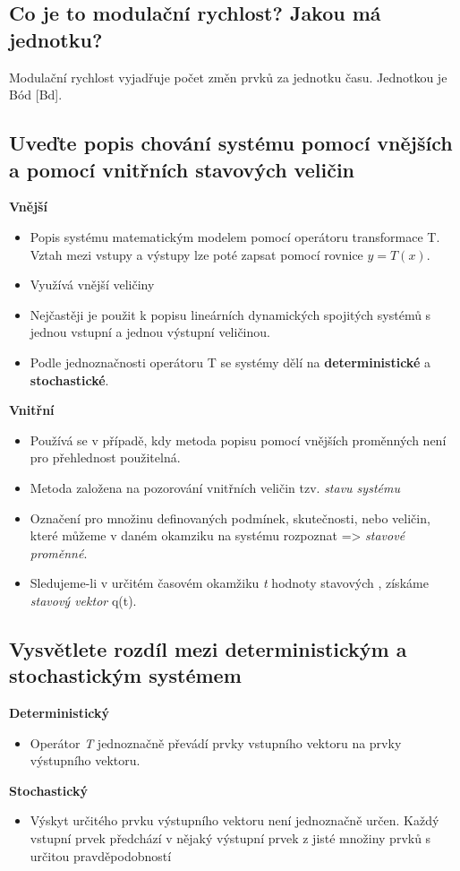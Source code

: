 \subsection{Co je to modulační rychlost? Jakou má jednotku?}
Modulační rychlost vyjadřuje počet změn prvků za jednotku času. Jednotkou je Bód [Bd].

\subsection{Uveďte popis chování systému pomocí vnějších a pomocí vnitřních stavových veličin}
\textbf{Vnější}
\begin{itemize}
    \item Popis systému matematickým modelem pomocí operátoru transformace T. Vztah mezi vstupy a výstupy lze poté zapsat pomocí rovnice $y=T(x)$.
    \item Využívá vnější veličiny
    \item Nejčastěji je použit k popisu lineárních dynamických  spojitých systémů s jednou vstupní a jednou výstupní veličinou.
    \item Podle jednoznačnosti operátoru T se systémy dělí na \textbf{deterministické} a \textbf{stochastické}.
    
\end{itemize}

\textbf{Vnitřní}
\begin{itemize}
    \item Používá se v případě, kdy metoda popisu pomocí vnějších proměnných není pro přehlednost použitelná.
    \item Metoda založena na pozorování vnitřních veličin tzv. \textit{stavu systému}
    \item Označení pro množinu definovaných podmínek, skutečnosti, nebo veličin, které můžeme v daném okamziku na systému rozpoznat => \textit{stavové proměnné}.
    \item Sledujeme-li v určitém časovém okamžiku \textit{t} hodnoty stavových , získáme \textit{stavový vektor} q(t).
\end{itemize}

\subsection{Vysvětlete rozdíl mezi deterministickým a stochastickým systémem}

\textbf{Deterministický}
\begin{itemize}
    \item Operátor \emph{T} jednoznačně převádí prvky vstupního vektoru na prvky výstupního vektoru.

\end{itemize}
\textbf{Stochastický}
\begin{itemize}
    \item Výskyt určitého prvku výstupního vektoru není jednoznačně určen.
    Každý vstupní prvek předchází v nějaký výstupní prvek z jisté množiny prvků s určitou pravděpodobností
    
\end{itemize}
